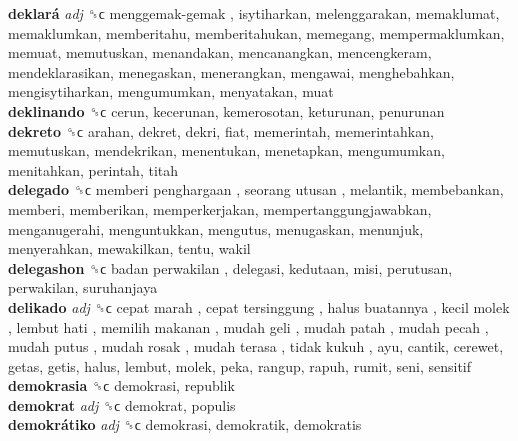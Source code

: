 \textbf{deklará} \emph{adj}  ␝ϲ   menggemak-gemak , isytiharkan, melenggarakan, memaklumat, memaklumkan, memberitahu, memberitahukan, memegang, mempermaklumkan, memuat, memutuskan, menandakan, mencanangkan, mencengkeram, mendeklarasikan, menegaskan, menerangkan, mengawai, menghebahkan, mengisytiharkan, mengumumkan, menyatakan, muat  \\
\textbf{deklinando} ␝ϲ  cerun, kecerunan, kemerosotan, keturunan, penurunan  \\
\textbf{dekreto} ␝ϲ  arahan, dekret, dekri, fiat, memerintah, memerintahkan, memutuskan, mendekrikan, menentukan, menetapkan, mengumumkan, menitahkan, perintah, titah  \\
\textbf{delegado} ␝ϲ   memberi penghargaan ,  seorang utusan , melantik, membebankan, memberi, memberikan, memperkerjakan, mempertanggungjawabkan, menganugerahi, menguntukkan, mengutus, menugaskan, menunjuk, menyerahkan, mewakilkan, tentu, wakil  \\
\textbf{delegashon} ␝ϲ   badan perwakilan , delegasi, kedutaan, misi, perutusan, perwakilan, suruhanjaya  \\
\textbf{delikado} \emph{adj}  ␝ϲ   cepat marah ,  cepat tersinggung ,  halus buatannya ,  kecil molek ,  lembut hati ,  memilih makanan ,  mudah geli ,  mudah patah ,  mudah pecah ,  mudah putus ,  mudah rosak ,  mudah terasa ,  tidak kukuh , ayu, cantik, cerewet, getas, getis, halus, lembut, molek, peka, rangup, rapuh, rumit, seni, sensitif  \\
\textbf{demokrasia} ␝ϲ  demokrasi, republik  \\
\textbf{demokrat} \emph{adj}  ␝ϲ  demokrat, populis  \\
\textbf{demokrátiko} \emph{adj}  ␝ϲ  demokrasi, demokratik, demokratis  \\
